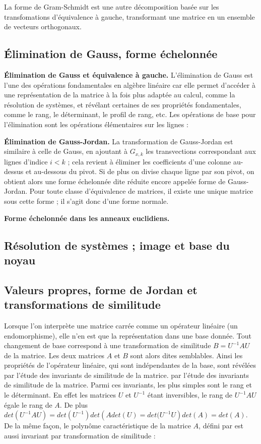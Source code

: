 La forme de Gram-Schmidt est une autre décomposition basée sur les transfomations d’équivalence à gauche, transformant une matrice en un ensemble de vecteurs orthogonaux.

\subsection{ Élimination de Gauss, forme échelonnée}
\textbf{Élimination de Gauss et équivalence à gauche.} L’élimination de Gauss est l’une des opérations fondamentales en algèbre linéaire car elle permet d’accéder à une représentation de la matrice à la fois plus adaptée au calcul, comme la résolution de systèmes, et révélant certaines de ses propriétés fondamentales,
comme le rang, le déterminant, le profil de rang, etc. Les opérations de base pour l’élimination sont les opérations élémentaires sur les lignes :

\textbf{Élimination de Gauss-Jordan.} La transformation de Gauss-Jordan est similaire à celle de Gauss, en ajoutant à $G_{x,k}$ les transvections correspondant aux lignes d’indice $i < k$ ; cela revient à éliminer les coefficients d’une colonne au-dessus et au-dessous du pivot. Si de plus on divise chaque ligne par son pivot, on obtient alors une forme échelonnée dite réduite encore appelée forme de Gauss-Jordan. Pour toute classe d’équivalence de matrices, il existe une unique matrice sous cette forme ; il s’agit donc d’une forme normale.

\textbf{Forme échelonnée dans les anneaux euclidiens.}
\subsection{ Résolution de systèmes ; image et base du noyau}
\subsection{Valeurs propres, forme de Jordan et transformations de similitude}
Lorsque l’on interprète une matrice carrée comme un opérateur linéaire (un endomorphisme), elle n’en est que la représentation dans une base donnée. Tout changement de base correspond à une transformation de similitude 
$B = U^{-1}AU$ de la matrice. Les deux matrices $A$ et $B$ sont alors dites semblables. Ainsi les propriétés de l’opérateur linéaire, qui sont indépendantes de la base, sont révélées par l’étude des invariants de similitude de la matrice.
par l’étude des invariants de similitude de la matrice. Parmi ces invariants, les plus simples sont le rang et le déterminant. En effet les matrices $U$ et $U^{-1}$ étant inversibles, le rang de $U^{-1}AU$ égale le rang de $A$. De plus $det\left( U^{-1}AU\right)  = det\left( U^{-1}\right) det \left(A det(U) = det(U^{-1}U\right) det\left( A\right) = det\left(A\right)$. De
la même façon, le polynôme caractéristique de la matrice $A$, défini par 
 est aussi invariant par transformation de similitude :
%

